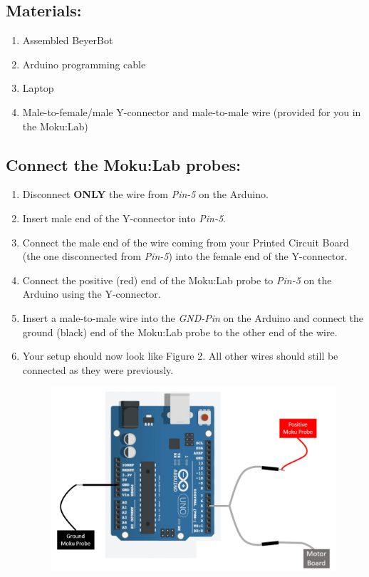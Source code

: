 \documentclass{handout}
\begin{document}
	\subsection{Materials:}
	
	\begin{enumerate}
		\item Assembled BeyerBot
		\item Arduino programming cable
		\item Laptop
		\item Male-to-female/male Y-connector and male-to-male wire (provided for you in the Moku:Lab)
	\end{enumerate}

	\subsection{Connect the Moku:Lab probes:}
	\begin{enumerate}
		\item Disconnect \textbf{ONLY} the wire from \textit{Pin-5} on the Arduino.
		\item Insert male end of the Y-connector into \textit{Pin-5}.
		\item Connect the male end of the wire coming from your Printed Circuit Board (the one disconnected from \textit{Pin-5}) into the female end of the Y-connector.
		\item Connect the positive (red) end of the Moku:Lab probe to \textit{Pin-5} on the Arduino using the Y-connector.
		\item Insert a male-to-male wire into the \textit{GND-Pin} on the Arduino and connect the ground (black) end of the Moku:Lab probe to the other end of the wire.
		\item Your setup should now look like Figure 2. All other wires should still be connected as they were previously.
		\begin{figure} [H]
			\centering
			\includegraphics[width=.75\textwidth]{Figure4.PNG}
			\caption{}
		\end{figure}
	\end{enumerate}
			\newpage
	\clearpage
	\pagebreak
\end{document}
